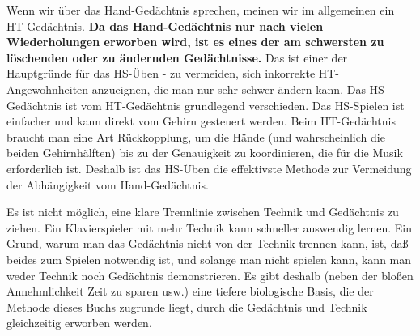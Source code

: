 Wenn wir über das Hand-Gedächtnis sprechen, meinen wir im allgemeinen ein HT-Gedächtnis.
\textbf{Da das Hand-Gedächtnis nur nach vielen Wiederholungen erworben wird, ist es eines der am schwersten zu löschenden oder zu ändernden Gedächtnisse.}
Das ist einer der Hauptgründe für das HS-Üben - zu vermeiden, sich inkorrekte HT-Angewohnheiten anzueignen, die man nur sehr schwer ändern kann.
Das HS-Gedächtnis ist vom HT-Gedächtnis grundlegend verschieden.
Das HS-Spielen ist einfacher und kann direkt vom Gehirn gesteuert werden.
Beim HT-Gedächtnis braucht man eine Art Rückkopplung, um die Hände (und wahrscheinlich die beiden Gehirnhälften) bis zu der Genauigkeit zu koordinieren, die für die Musik erforderlich ist.
Deshalb ist das HS-Üben die effektivste Methode zur Vermeidung der Abhängigkeit vom Hand-Gedächtnis.

Es ist nicht möglich, eine klare Trennlinie zwischen Technik und Gedächtnis zu ziehen.
Ein Klavierspieler mit mehr Technik kann schneller auswendig lernen.
Ein Grund, warum man das Gedächtnis nicht von der Technik trennen kann, ist, daß beides zum Spielen notwendig ist, und solange man nicht spielen kann, kann man weder Technik noch Gedächtnis demonstrieren.
Es gibt deshalb (neben der bloßen Annehmlichkeit Zeit zu sparen usw.) eine tiefere biologische Basis, die der Methode dieses Buchs zugrunde liegt, durch die Gedächtnis und Technik gleichzeitig erworben werden.
 


